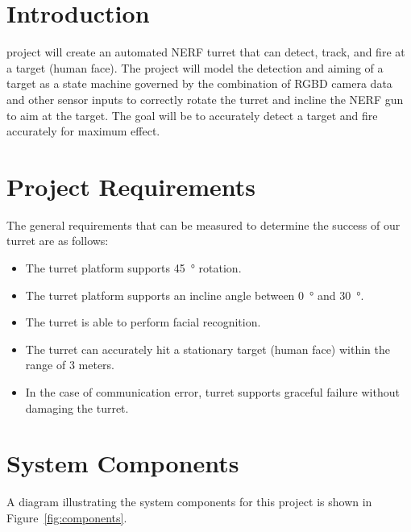 \documentclass[journal]{IEEEtran}
\begin{document}

\section{Introduction}

 project will create an automated NERF turret that can detect, track, and fire at a target (human face). The project will model the detection and aiming of a target as a state machine governed by the combination of RGBD camera data and other sensor inputs to correctly rotate the turret and incline the NERF gun to aim at the target. The goal will be to accurately detect a target and fire accurately for maximum effect.

\section{Project Requirements}

The general requirements that can be measured to determine the success of our turret are as follows:
\begin{itemize}
\item
The turret platform supports \SI{45}{\degree} rotation.
\item
The turret platform supports an incline angle between \SI{0}{\degree} and \SI{30}{\degree}.
\item
The turret is able to perform facial recognition.
\item
The turret can accurately hit a stationary target (human face) within the range of 3 meters.
\item
In the case of communication error, turret supports graceful failure without damaging the turret.
\end{itemize}

\section{System Components}

A diagram illustrating the system components for this project is shown in Figure~\ref{fig:components}. 
\end{document}
